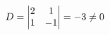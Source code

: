 \documentclass[preview]{standalone}
\begin{document}
\begin{align*}
\special{dvisvgm:raw <g id='unique000'>}D=\begin{vmatrix} 2 & 1 \\ 1 & -1 \end{vmatrix}=-3\neq0\special{dvisvgm:raw </g>}
\end{align*}
\end{document}
